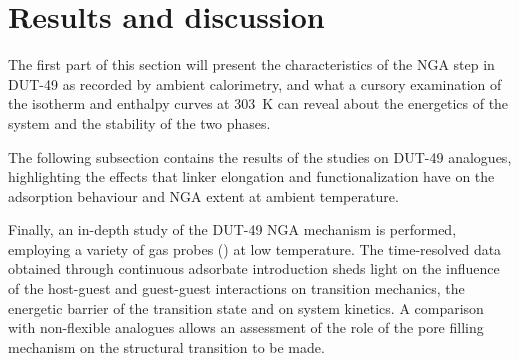 
\section{Results and discussion}

The first part of this section will present the characteristics of the
NGA step in DUT-49 as recorded by ambient calorimetry, 
and what a cursory examination of the isotherm and enthalpy
curves at \SI{303}{\kelvin} can reveal about the energetics of the 
system and the stability of the two phases.

The following subsection contains the results of the studies on 
DUT-49 analogues, highlighting the effects that linker elongation
and functionalization have on the adsorption behaviour and NGA
extent at ambient temperature.

Finally, an in-depth study of the DUT-49 NGA mechanism is performed,
employing a variety of gas probes () at low temperature.
The time-resolved data obtained through continuous adsorbate introduction
sheds light on the influence of the host-guest and guest-guest interactions
on transition mechanics, the energetic barrier of the transition state
and on system kinetics. A comparison with non-flexible analogues allows
an assessment of the role of the pore filling mechanism on the structural
transition to be made.




